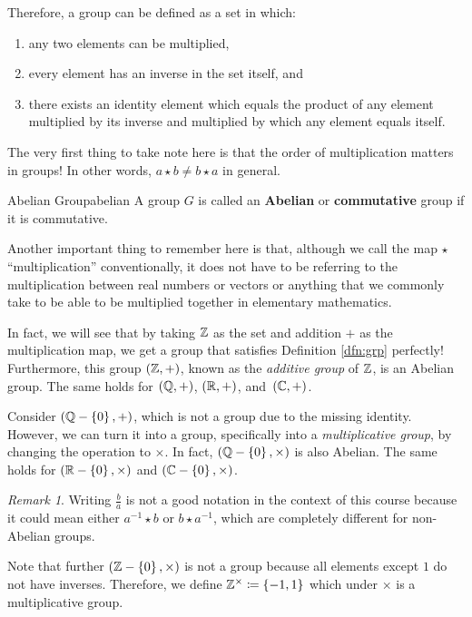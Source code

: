 \documentclass[math]{amznotes}
\theoremstyle{remark}
\newtheorem*{remark}{Remark}
\newcommand{\0}{\mathbf{0}}
\newcommand{\1}{\mathbf{1}}
\begin{document}
Therefore, a group can be defined as a set in which:
\begin{enumerate}
    \item any two elements can be multiplied,
    \item every element has an inverse in the set itself, and
    \item there exists an identity element which equals the product of any element multiplied by its inverse and multiplied by which any element equals itself.
\end{enumerate}
The very first thing to take note here is that the order of multiplication matters in groups! In other words, $a \star b \neq b \star a$ in general.
\begin{dfnbox}{Abelian Group}{abelian}
    A group $G$ is called an {\color{red} \textbf{Abelian}} or {\color{red} \textbf{commutative}} group if it is commutative.
\end{dfnbox}
Another important thing to remember here is that, although we call the map $\star$ ``multiplication'' conventionally, it does not have to be referring to the multiplication between real numbers or vectors or anything that we commonly take to be able to be multiplied together in elementary mathematics. 

In fact, we will see that by taking $\mathbb{Z}$ as the set and addition $+$ as the multiplication map, we get a group that satisfies Definition \ref{dfn:grp} perfectly! Furthermore, this group $\left(\mathbb{Z}, +\right)$, known as the \textit{additive group} of $\mathbb{Z}$, is an Abelian group. The same holds for $\left(\mathbb{Q}, +\right)$, $\left(\mathbb{R}, +\right)$, and~$\left(\mathbb{C}, +\right)$.

Consider $\left(\mathbb{Q} - \left\{0\right\}, +\right)$, which is not a group due to the missing identity. However, we can turn it into a group, specifically into a \textit{multiplicative group}, by changing the operation to $\times$. In fact, $\left(\mathbb{Q} - \left\{0\right\}, \times\right)$ is also Abelian. The same holds for $\left(\mathbb{R} - \left\{0\right\}, \times\right)$ and $\left(\mathbb{C} - \left\{0\right\}, \times\right)$.
\begin{notebox}
    \begin{remark}
        Writing $\frac{b}{a}$ is not a good notation in the context of this course because it could mean either $a^{-1} \star b$ or $b \star a^{-1}$, which are completely different for non-Abelian groups.
    \end{remark}
\end{notebox}
Note that further $\left(\mathbb{Z} - \left\{0\right\}, \times\right)$ is not a group because all elements except $1$ do not have inverses. Therefore, we define $\mathbb{Z}^{\times} \coloneqq \{-1, 1\}$ which under $\times$ is a multiplicative group.
\end{document}
